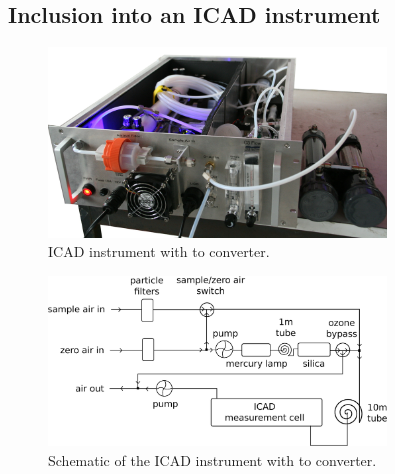 \subsection{Inclusion into an ICAD instrument}
\label{sec:inclusion}

\begin{figure}[htbp]
  \centering
  \includegraphics[width=0.8\textwidth]{images/InstrumentEdited_small.jpg}
  \caption{ICAD instrument with  to 
    converter.}
  \label{fig:envimes}
\end{figure}

\begin{figure}[htbp]
  \centering
  \includegraphics[width=0.8\textwidth]{images/envimes_setup.eps}
  \caption{Schematic of the  ICAD instrument with  to
     converter.}
  \label{fig:envimes-schematic}
\end{figure}

